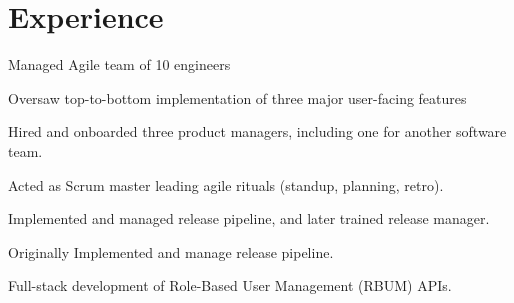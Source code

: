 \documentclass[]{csaund_resume-openfont}
\begin{document}
\begin{minipage}[t]{0.66\textwidth}


\section{Experience}

\vspace{\topsep} %
\begin{tightemize}
\item Managed Agile team of 10 engineers 
\item Oversaw top-to-bottom implementation of three major user-facing features
\item Hired and onboarded three product managers, including one for another software team.
\item Acted as Scrum master leading agile rituals (standup, planning, retro).
\item Implemented and managed release pipeline, and later trained release manager.
\end{tightemize}

\begin{tightemize}
\item Originally Implemented and manage release pipeline.
\item Full-stack development of Role-Based User Management (RBUM) APIs.
\end{tightemize}
\sectionsep


\end{minipage}
\end{document}
